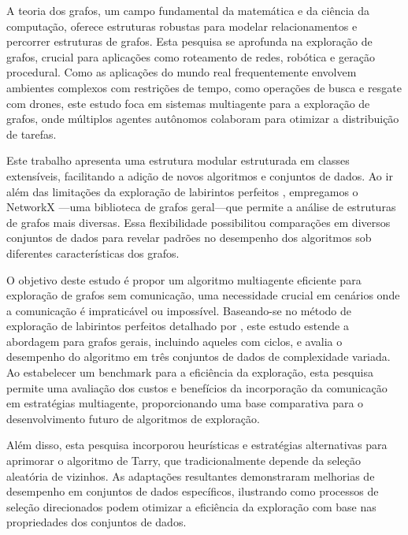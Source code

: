 A teoria dos grafos, um campo fundamental da matemática e da ciência da computação, oferece estruturas robustas para modelar relacionamentos e percorrer estruturas de grafos. Esta pesquisa se aprofunda na exploração de grafos, crucial para aplicações como roteamento de redes, robótica e geração procedural. Como as aplicações do mundo real frequentemente envolvem ambientes complexos com restrições de tempo, como operações de busca e resgate com drones, este estudo foca em sistemas multiagente para a exploração de grafos, onde múltiplos agentes autônomos colaboram para otimizar a distribuição de tarefas.

Este trabalho apresenta uma estrutura modular estruturada em classes extensíveis, facilitando a adição de novos algoritmos e conjuntos de dados. Ao ir além das limitações da exploração de labirintos perfeitos \cite{Naeem2021}, empregamos o NetworkX \cite{Hagberg2008}—uma biblioteca de grafos geral—que permite a análise de estruturas de grafos mais diversas. Essa flexibilidade possibilitou comparações em diversos conjuntos de dados para revelar padrões no desempenho dos algoritmos sob diferentes características dos grafos.

O objetivo deste estudo é propor um algoritmo multiagente eficiente para exploração de grafos sem comunicação, uma necessidade crucial em cenários onde a comunicação é impraticável ou impossível. Baseando-se no método de exploração de labirintos perfeitos detalhado por , este estudo estende a abordagem para grafos gerais, incluindo aqueles com ciclos, e avalia o desempenho do algoritmo em três conjuntos de dados de complexidade variada. Ao estabelecer um benchmark para a eficiência da exploração, esta pesquisa permite uma avaliação dos custos e benefícios da incorporação da comunicação em estratégias multiagente, proporcionando uma base comparativa para o desenvolvimento futuro de algoritmos de exploração.

Além disso, esta pesquisa incorporou heurísticas e estratégias alternativas para aprimorar o algoritmo de Tarry, que tradicionalmente depende da seleção aleatória de vizinhos. As adaptações resultantes demonstraram melhorias de desempenho em conjuntos de dados específicos, ilustrando como processos de seleção direcionados podem otimizar a eficiência da exploração com base nas propriedades dos conjuntos de dados.